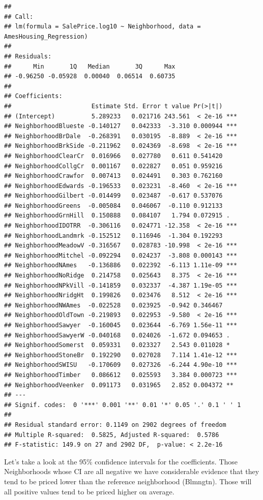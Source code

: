 \documentclass[
]{book}
\theoremstyle{definition}
\theoremstyle{definition}
\theoremstyle{definition}
\theoremstyle{definition}
\theoremstyle{remark}
\begin{document}
\begin{verbatim}
## 
## Call:
## lm(formula = SalePrice.log10 ~ Neighborhood, data = AmesHousing_Regression)
## 
## Residuals:
##      Min       1Q   Median       3Q      Max 
## -0.96250 -0.05928  0.00040  0.06514  0.60735 
## 
## Coefficients:
##                      Estimate Std. Error t value Pr(>|t|)    
## (Intercept)          5.289233   0.021716 243.561  < 2e-16 ***
## NeighborhoodBlueste -0.140127   0.042333  -3.310 0.000944 ***
## NeighborhoodBrDale  -0.268391   0.030195  -8.889  < 2e-16 ***
## NeighborhoodBrkSide -0.211962   0.024369  -8.698  < 2e-16 ***
## NeighborhoodClearCr  0.016966   0.027780   0.611 0.541420    
## NeighborhoodCollgCr  0.001167   0.022827   0.051 0.959216    
## NeighborhoodCrawfor  0.007413   0.024491   0.303 0.762160    
## NeighborhoodEdwards -0.196533   0.023231  -8.460  < 2e-16 ***
## NeighborhoodGilbert -0.014499   0.023487  -0.617 0.537076    
## NeighborhoodGreens  -0.005084   0.046067  -0.110 0.912133    
## NeighborhoodGrnHill  0.150888   0.084107   1.794 0.072915 .  
## NeighborhoodIDOTRR  -0.306116   0.024771 -12.358  < 2e-16 ***
## NeighborhoodLandmrk -0.152512   0.116946  -1.304 0.192293    
## NeighborhoodMeadowV -0.316567   0.028783 -10.998  < 2e-16 ***
## NeighborhoodMitchel -0.092294   0.024237  -3.808 0.000143 ***
## NeighborhoodNAmes   -0.136886   0.022392  -6.113 1.11e-09 ***
## NeighborhoodNoRidge  0.214758   0.025643   8.375  < 2e-16 ***
## NeighborhoodNPkVill -0.141859   0.032337  -4.387 1.19e-05 ***
## NeighborhoodNridgHt  0.199826   0.023476   8.512  < 2e-16 ***
## NeighborhoodNWAmes  -0.022528   0.023925  -0.942 0.346467    
## NeighborhoodOldTown -0.219893   0.022953  -9.580  < 2e-16 ***
## NeighborhoodSawyer  -0.160045   0.023644  -6.769 1.56e-11 ***
## NeighborhoodSawyerW -0.040168   0.024026  -1.672 0.094653 .  
## NeighborhoodSomerst  0.059331   0.023327   2.543 0.011028 *  
## NeighborhoodStoneBr  0.192290   0.027028   7.114 1.41e-12 ***
## NeighborhoodSWISU   -0.170609   0.027326  -6.244 4.90e-10 ***
## NeighborhoodTimber   0.086612   0.025593   3.384 0.000723 ***
## NeighborhoodVeenker  0.091173   0.031965   2.852 0.004372 ** 
## ---
## Signif. codes:  0 '***' 0.001 '**' 0.01 '*' 0.05 '.' 0.1 ' ' 1
## 
## Residual standard error: 0.1149 on 2902 degrees of freedom
## Multiple R-squared:  0.5825, Adjusted R-squared:  0.5786 
## F-statistic: 149.9 on 27 and 2902 DF,  p-value: < 2.2e-16
\end{verbatim}

Let's take a look at the 95\% confidence intervals for the coefficients. Those Neighborhoods whose CI are all negative we have considerable evidence that they tend to be priced lower than the reference neighborhood (Blmngtn). Those will all positive values tend to be priced higher on average.
\end{document}
